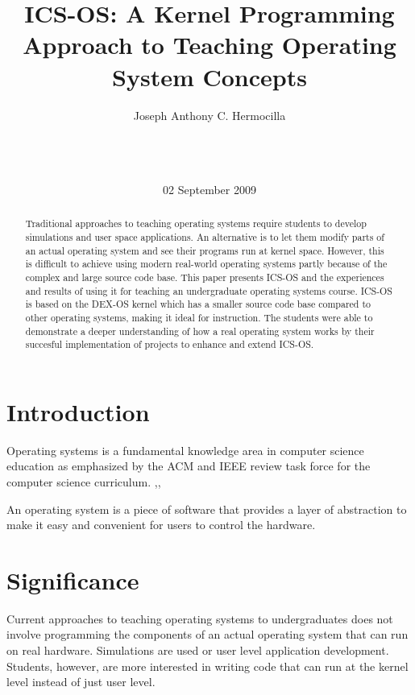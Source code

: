 \documentclass{acm_proc_article-sp}
\begin{document}
\title{ICS-OS: A Kernel Programming Approach to Teaching Operating System
Concepts}

\author{
\alignauthor
Joseph Anthony C. Hermocilla\\
       \\
       \\
       \\
}
\date{02 September 2009}

\maketitle
\begin{abstract}
Traditional approaches to teaching operating systems require students to
develop simulations and user space applications. An alternative
is to let them modify parts of an actual operating system and see their
programs run at kernel space. However, this is difficult to 
achieve using modern real-world operating systems partly because of the complex
and large source code base. This paper presents ICS-OS and the experiences and
results of using it for teaching an undergraduate operating systems course. 
ICS-OS is based on the DEX-OS kernel which has a smaller source code base
compared to other operating systems, making it ideal for instruction. 
The students were able to demonstrate a deeper understanding
of how a real operating system works by their succesful implementation of
projects to enhance and extend ICS-OS.
\end{abstract}


\section{Introduction}
Operating systems is a fundamental knowledge area in computer science education
as emphasized by the ACM and IEEE review task force for the computer science 
curriculum. \cite{silberschatz:osc},\cite{tanenbaum:osdai},\cite{dayo:dexos}

An operating system is a piece of software that provides a layer 
of abstraction to make it easy and convenient for users to control the hardware.

\section{Significance}
Current approaches to teaching operating systems to undergraduates does not
involve programming the components of an actual operating system that can run
on real hardware. Simulations are used or user level application development.
Students, however, are more interested in writing code that can run at the
kernel level instead of just user level. 
\end{document}
